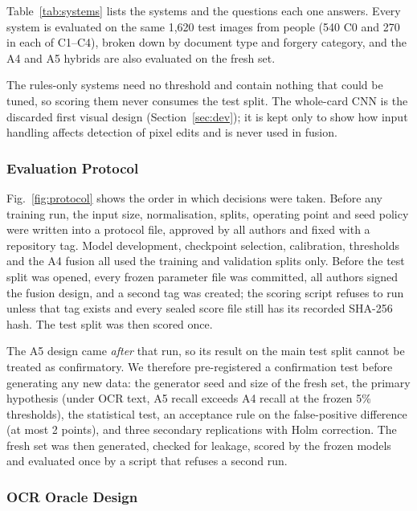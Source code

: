 \documentclass[12pt]{article}
\begin{document}
Table~\ref{tab:systems} lists the systems and the questions each one
answers. Every system is evaluated on the same 1{,}620 test images from
\dsTestPer{} people (540 C0 and 270 in each of C1--C4), broken down by
document type and forgery category, and the A4 and A5 hybrids are also
evaluated on the fresh set.


The rules-only systems need no threshold and contain nothing that could
be tuned, so scoring them never consumes the test split. The whole-card
CNN is the discarded first visual design (Section~\ref{sec:dev}); it is
kept only to show how input handling affects detection of pixel edits
and is never used in fusion.

\subsubsection{Evaluation Protocol}
\label{sec:protocol}

Fig.~\ref{fig:protocol} shows the order in which decisions were taken.
Before any training run, the input size, normalisation, splits, operating
point and seed policy were written into a protocol file, approved by
all authors and fixed with a repository tag. Model development,
checkpoint selection, calibration, thresholds and the A4 fusion all used
the training and validation splits only. Before the test split was
opened, every frozen parameter file was committed, all authors
signed the fusion design, and a second tag was created; the scoring
script refuses to run unless that tag exists and every sealed score file
still has its recorded SHA-256 hash. The test split was then scored once.

The A5 design came \emph{after} that run, so its result on the main test
split cannot be treated as confirmatory. We therefore pre-registered a
confirmation test before generating any new data: the generator seed and
size of the fresh set, the primary hypothesis (under OCR text, A5 recall
exceeds A4 recall at the frozen 5\% thresholds), the statistical test,
an acceptance rule on the false-positive difference (at most 2 points),
and three secondary replications with Holm correction. The fresh set was
then generated, checked for leakage, scored by the frozen models and
evaluated once by a script that refuses a second run.


\subsubsection{OCR Oracle Design}
\label{subsec:oracle}
\end{document}
